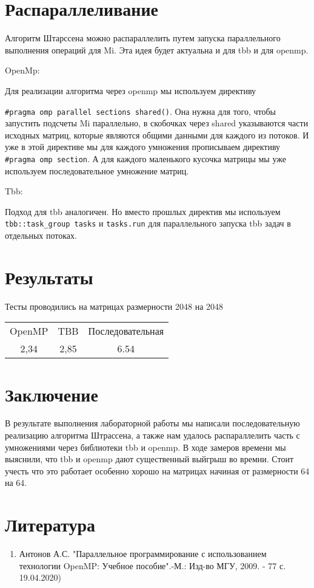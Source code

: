 \documentclass{report}
\begin{document}
\newpage
\section{Распараллеливание}
\par Алгоритм Штарссена можно распараллелить путем запуска параллельного выполнения операций для Mi. Эта идея будет актуальна и для tbb и для openmp.

\par OpenMp:
\par Для реализации алгоритма через openmp мы используем директиву 
\par
\verb|#pragma omp parallel sections shared()|. Она нужна для того, чтобы запустить подсчеты Mi параллельно, в скобочках через shared указываются части исходных матриц, которые являются общими данными для каждого из потоков. И уже в этой директиве мы для каждого умножения прописываем директиву \verb|#pragma omp section|. А для каждого маленького кусочка матрицы мы уже используем последовательное умножение матриц.

\par Tbb:
\par Подход для tbb аналогичен. Но вместо прошлых директив мы используем
\verb|tbb::task_group tasks| и \verb|tasks.run| для параллельного запуска tbb задач в отдельных потоках.


\newpage
\section{Результаты}
\par Тесты проводились на матрицах размерности 2048 на 2048

\begin{tabular}{|c|c|c|}
OpenMP & TBB &  Последовательная \\
2,34 & 2,85 & 6.54 
\end{tabular}








\newpage
\section{Заключение}
\par В результате выполнения лабораторной работы мы написали последовательную реализацию алгоритма Штрассена,  а также нам удалось распараллелить часть с умножениями через библиотеки tbb и openmp. В ходе замеров времени мы выяснили, что tbb и openmp дают существенный выйгрыш во времни. Стоит учесть что это работает особенно хорошо на матрицах начиная от размерности 64 на 64.



\newpage
\section{Литература}
\begin{enumerate}
\item Антонов А.С. "Параллельное программирование с использованием технологии OpenMP: Учебное пособие".-М.: Изд-во МГУ, 2009. - 77 с. 19.04.2020)
\end{enumerate}
\end{document}
